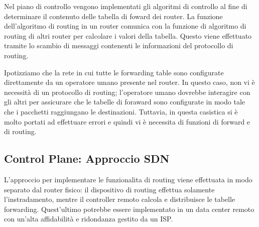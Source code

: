 \documentclass{book}
\begin{document}
Nel piano di controllo vengono implementati gli algoritmi di controllo al fine
di determinare il contenuto delle tabella di foward dei router. La funzione
dell'algoritmo di routing in un router comunica con la funzione di algoritmo
di routing di altri router per calcolare i valori della tabella. Questo viene
effettuato tramite lo scambio di messaggi contenenti le informazioni del
protocollo di routing.

Ipotizziamo che la rete in cui tutte le forwarding table sono configurate
direttamente da un operatore umano presente nel router. In questo caso, non vi
{\`e} necessit{\`a} di un protocollo di routing; l'operatore umano dovrebbe
interagire con gli altri per assicurare che le tabelle di foraward sono
configurate in modo tale che i pacchetti raggiungano le destinazioni.
Tuttavia, in questa casistica si {\`e} molto portati ad effettuare errori e
quindi vi {\`e} necessita di funzioni di forward e di routing.

\subsection{Control Plane: Approccio SDN }

{}

L'approccio per implementare le funzionalita di routing viene effettuata in
modo separato dal router fisico: il dispositivo di routing effettua solamente
l'instradamento, mentre il controller remoto calcola e distribuisce le tabelle
forwarding. Quest'ultimo potrebbe essere implementato in un data center remoto
con un'alta affidabilit{\`a} e ridondanza gestito da un ISP.
\end{document}
